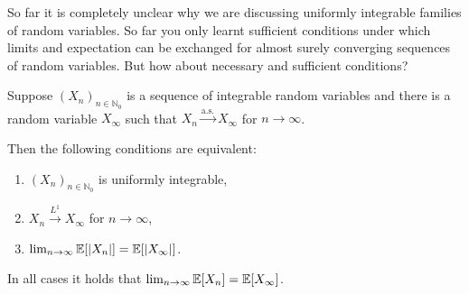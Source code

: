 So far it is completely unclear why we are discussing uniformly integrable families of random variables. So far you only learnt sufficient conditions under which limits and expectation can be exchanged for almost surely converging sequences of random variables. But how about necessary and sufficient conditions?
\begin{lsatzwichtig}
\begin{theorem}\label{generalized_DCT}
	Suppose $(X_n)_{n\in\mathbb{N}_0}$ is a sequence of integrable random variables and there is a random variable $X_\infty$ such that $X_n \overset{\text{a.s.}}{\to} X_{\infty}$ for $n\to\infty$.\smallskip
	
	Then the following conditions are equivalent:
	\begin{enumerate}[label=(\roman*)]
		\item
			$(X_n)_{n\in\mathbb{N}_0}$ is uniformly integrable,
		\item
			$X_n \overset{L^1}{\to}X_{\infty}$ for $n \to \infty$,
		\item
			$\lim_{n\to\infty}\mathbb{E}[\lvert X_n\rvert] = \mathbb{E}[\lvert X_{\infty}\rvert]$.
	\end{enumerate}
	In all cases it holds that $\lim_{n\to\infty}\mathbb{E}[ X_n] = \mathbb{E}[ X_{\infty}]$.
\end{theorem}
\end{lsatzwichtig}
